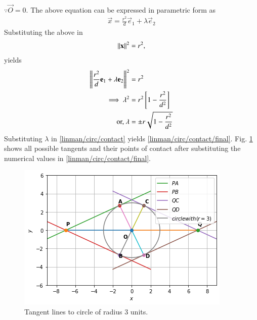 \begin{enumerate}[label=\thesubsection.\arabic*.,ref=\thesubsection.\theenumi]
\begin{align}
  \end{align}
  $\because \vec{O} = 0$.  The above equation can be expressed in parametric form as 
 \begin{align}
  \vec{x} = \frac{r^2}{d}\vec{e}_1 + \lambda \vec{e}_2
  \label{linman/circ/contact}
 \end{align}
 Substituting the above in 
 \begin{align}
  \left\lVert\mathbf{x}\right\rVert^2 = r^2,
 \end{align}
 yields
\begin{align}
\left\lVert\frac{r^2}{d}\mathbf{e}_1 + \lambda \mathbf{e}_2\right\rVert^2&=r^2
\\
\implies \lambda^2 &= r^2{}\left[1 - \frac{r^2}{d^2}\right]
\\
\text{or, }\lambda &= \pm r\sqrt{1 - \frac{r^2}{d^2}}
\end{align}
%
Substituting $\lambda $ in \eqref{linman/circ/contact} yields \eqref{linman/circ/contact/final}.  Fig.  \ref{fig:Tangent lines to circle of radius 3 units.} shows all possible tangents
and their points of contact after substituting the numerical values in \eqref{linman/circ/contact/final}.
%
\begin{figure}[ht]
  \centering
  \includegraphics[width=\columnwidth]{solutions/su2021/circle/2/57/FIGURE3.png}
  \caption{Tangent lines to circle of radius 3 units.}
  \label{fig:Tangent lines to circle of radius 3 units.}
\end{figure}
%
\end{enumerate}
